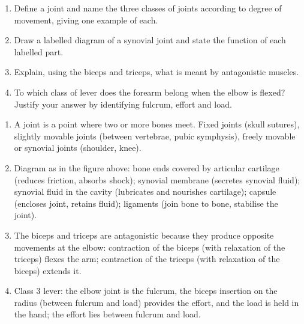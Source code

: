 \documentclass[11pt]{article}
\begin{document}
\begin{exercice}
\begin{enumerate}
\item Define a joint and name the three classes of joints according to degree of movement, giving one example of each.
\item Draw a labelled diagram of a synovial joint and state the function of each labelled part.
\item Explain, using the biceps and triceps, what is meant by antagonistic muscles.
\item To which class of lever does the forearm belong when the elbow is flexed? Justify your answer by identifying fulcrum, effort and load.
\end{enumerate}
\end{exercice}

\begin{corrige}[Exercise 1]
\begin{enumerate}
\item A joint is a point where two or more bones meet. Fixed joints (skull sutures), slightly movable joints (between vertebrae, pubic symphysis), freely movable or synovial joints (shoulder, knee).
\item Diagram as in the figure above: bone ends covered by articular cartilage (reduces friction, absorbs shock); synovial membrane (secretes synovial fluid); synovial fluid in the cavity (lubricates and nourishes cartilage); capsule (encloses joint, retains fluid); ligaments (join bone to bone, stabilise the joint).
\item The biceps and triceps are antagonistic because they produce opposite movements at the elbow: contraction of the biceps (with relaxation of the triceps) flexes the arm; contraction of the triceps (with relaxation of the biceps) extends it.
\item Class 3 lever: the elbow joint is the fulcrum, the biceps insertion on the radius (between fulcrum and load) provides the effort, and the load is held in the hand; the effort lies between fulcrum and load.
\end{enumerate}
\end{corrige}
\end{document}
